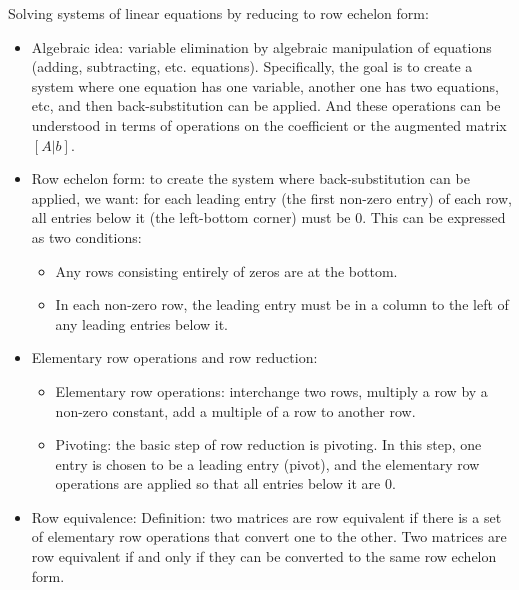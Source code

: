 \documentclass{report}
\begin{document}
Solving systems of linear equations by reducing to row echelon form: 
\begin{itemize}
\item Algebraic idea: variable elimination by algebraic manipulation of equations (adding, subtracting, etc. equations). Specifically, the goal is to create a system where one equation has one variable, another one has two equations, etc, and then back-substitution can be applied. And these operations can be understood in terms of operations on the coefficient or the augmented matrix $[A|b]$. 

\item Row echelon form: to create the system where back-substitution can be applied, we want: for each leading entry (the first non-zero entry) of each row, all entries below it (the left-bottom corner) must be 0. This can be expressed as two conditions: 
\begin{itemize}
\item Any rows consisting entirely of zeros are at the bottom. 
\item In each non-zero row, the leading entry must be in a column to the left of any leading entries below it. 
\end{itemize}
 
\item Elementary row operations and row reduction: 
\begin{itemize}
\item Elementary row operations: interchange two rows, multiply a row by a non-zero constant, add a multiple of a row to another row. 
\item Pivoting: the basic step of row reduction is pivoting. In this step, one entry is chosen to be a leading entry (pivot), and the elementary row operations are applied so that all entries below it are 0. 
\end{itemize}

\item Row equivalence: Definition: two matrices are row equivalent if there is a set of elementary row operations that convert one to the other. Two matrices are row equivalent if and only if they can be converted to the same row echelon form. 
\end{itemize}
\end{document}
